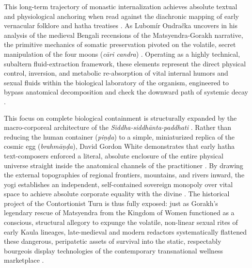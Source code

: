 \documentclass[11pt,twoside,letterpaper]{article}
\begin{document}
This long-term trajectory of monastic internalization achieves absolute textual and physiological anchoring when read against the diachronic mapping of early vernacular folklore and hatha treatises \cite{Lorenzen2011}. As Lubomír Ondračka uncovers in his analysis of the medieval Bengali recensions of the Matsyendra-Gorakh narrative, the primitive mechanics of somatic preservation pivoted on the volatile, secret manipulation of the four moons (\textit{cāri candra}) \cite{Lorenzen2011}. Operating as a highly technical, subaltern fluid-extraction framework, these elements represent the direct physical control, inversion, and metabolic re-absorption of vital internal humors and sexual fluids within the biological laboratory of the organism, engineered to bypass anatomical decomposition and check the downward path of systemic decay \cite{Lorenzen2011}. 

This focus on complete biological containment is structurally expanded by the macro-corporeal architecture of the \textit{Siddha-siddhānta-paddhati} \cite{Lorenzen2011}. Rather than reducing the human container (\textit{piṇḍa}) to a simple, miniaturized replica of the cosmic egg (\textit{brahmāṇḍa}), David Gordon White demonstrates that early hatha text-composers enforced a literal, absolute enclosure of the entire physical universe straight inside the anatomical channels of the practitioner \cite{Lorenzen2011}. By drawing the external topographies of regional frontiers, mountains, and rivers inward, the yogi establishes an independent, self-contained sovereign monopoly over vital space to achieve absolute corporate equality with the divine \cite{Lorenzen2011}. The historical project of the Contortionist Turn is thus fully exposed: just as Gorakh’s legendary rescue of Matsyendra from the Kingdom of Women functioned as a conscious, structural allegory to expunge the volatile, non-linear sexual rites of early Kaula lineages, late-medieval and modern redactors systematically flattened these dangerous, peripatetic assets of survival into the static, respectably bourgeois display technologies of the contemporary transnational wellness marketplace \cite{Birch2024, Debnath2024, Lorenzen2011}.
\end{document}
